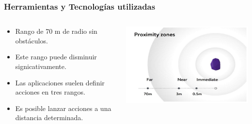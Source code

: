 \begin{frame}
	\frametitle{Herramientas y Tecnologías utilizadas}
	\begin{columns}
			\begin{column}{0.6\textwidth}
					\begin{itemize}
						\item {Rango de 70 m de radio sin obstáculos.}
						\item {Este rango puede disminuir signicativamente.}
						\item {Las aplicaciones suelen definir acciones en tres rangos.}
						\item {Es posible lanzar acciones a una distancia determinada.}
					\end{itemize}
				\endblock{}
			\end{column}
			\begin{column}{0.4\textwidth}
				\vfill 
					\begin{center}
						\includegraphics[width=0.95\linewidth]{Images/beaconsRange}
					\end{center}
			\end{column}
	\end{columns}
\end{frame}



